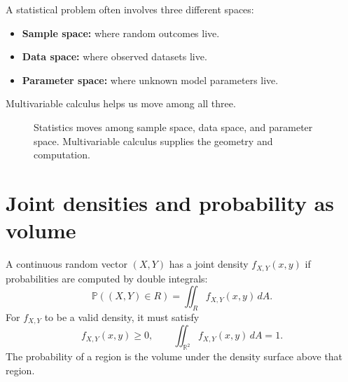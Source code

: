 \documentclass[11pt,oneside]{book}
\newcommand{\R}{\mathbb R}
\newcommand{\Prob}{\mathbb P}
\newcommand{\dd}{\,d}
\begin{document}
\begin{notebox}
A statistical problem often involves three different spaces:
\begin{itemize}
  \item \textbf{Sample space:} where random outcomes live.
  \item \textbf{Data space:} where observed datasets live.
  \item \textbf{Parameter space:} where unknown model parameters live.
\end{itemize}
Multivariable calculus helps us move among all three.
\end{notebox}

\begin{figure}[H]
\centering
{}
\caption{Statistics moves among sample space, data space, and parameter space. Multivariable calculus supplies the geometry and computation.}
\end{figure}

\section{Joint densities and probability as volume}

A continuous random vector $(X,Y)$ has a joint density $f_{X,Y}(x,y)$ if probabilities are computed by double integrals:
\[
\Prob((X,Y)\in R)=\iint_R f_{X,Y}(x,y)\dd A.
\]
For $f_{X,Y}$ to be a valid density, it must satisfy
\[
f_{X,Y}(x,y)\ge 0,
\qquad
\iint_{\R^2} f_{X,Y}(x,y)\dd A=1.
\]
The probability of a region is the volume under the density surface above that region.
\end{document}

